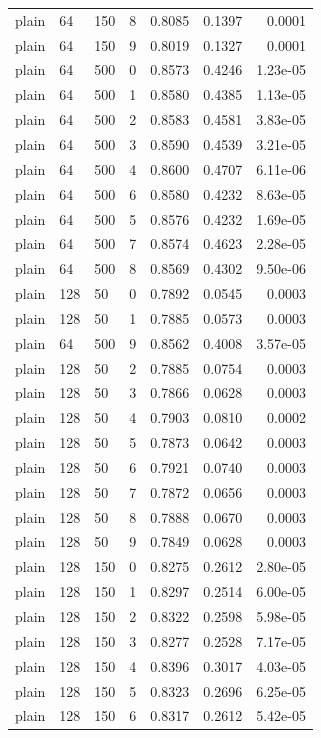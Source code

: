 \begin{footnotesize}
\begin{longtable}{lllrrrr}
plain & 64 & 150 & 8 & 0.8085 & 0.1397 & 0.0001 \\
plain & 64 & 150 & 9 & 0.8019 & 0.1327 & 0.0001 \\
plain & 64 & 500 & 0 & 0.8573 & 0.4246 & 1.23e-05 \\
plain & 64 & 500 & 1 & 0.8580 & 0.4385 & 1.13e-05 \\
plain & 64 & 500 & 2 & 0.8583 & 0.4581 & 3.83e-05 \\
plain & 64 & 500 & 3 & 0.8590 & 0.4539 & 3.21e-05 \\
plain & 64 & 500 & 4 & 0.8600 & 0.4707 & 6.11e-06 \\
plain & 64 & 500 & 6 & 0.8580 & 0.4232 & 8.63e-05 \\
plain & 64 & 500 & 5 & 0.8576 & 0.4232 & 1.69e-05 \\
plain & 64 & 500 & 7 & 0.8574 & 0.4623 & 2.28e-05 \\
plain & 64 & 500 & 8 & 0.8569 & 0.4302 & 9.50e-06 \\
plain & 128 & 50 & 0 & 0.7892 & 0.0545 & 0.0003 \\
plain & 128 & 50 & 1 & 0.7885 & 0.0573 & 0.0003 \\
plain & 64 & 500 & 9 & 0.8562 & 0.4008 & 3.57e-05 \\
plain & 128 & 50 & 2 & 0.7885 & 0.0754 & 0.0003 \\
plain & 128 & 50 & 3 & 0.7866 & 0.0628 & 0.0003 \\
plain & 128 & 50 & 4 & 0.7903 & 0.0810 & 0.0002 \\
plain & 128 & 50 & 5 & 0.7873 & 0.0642 & 0.0003 \\
plain & 128 & 50 & 6 & 0.7921 & 0.0740 & 0.0003 \\
plain & 128 & 50 & 7 & 0.7872 & 0.0656 & 0.0003 \\
plain & 128 & 50 & 8 & 0.7888 & 0.0670 & 0.0003 \\
plain & 128 & 50 & 9 & 0.7849 & 0.0628 & 0.0003 \\
plain & 128 & 150 & 0 & 0.8275 & 0.2612 & 2.80e-05 \\
plain & 128 & 150 & 1 & 0.8297 & 0.2514 & 6.00e-05 \\
plain & 128 & 150 & 2 & 0.8322 & 0.2598 & 5.98e-05 \\
plain & 128 & 150 & 3 & 0.8277 & 0.2528 & 7.17e-05 \\
plain & 128 & 150 & 4 & 0.8396 & 0.3017 & 4.03e-05 \\
plain & 128 & 150 & 5 & 0.8323 & 0.2696 & 6.25e-05 \\
plain & 128 & 150 & 6 & 0.8317 & 0.2612 & 5.42e-05 \\

\end{longtable}
\end{footnotesize}
